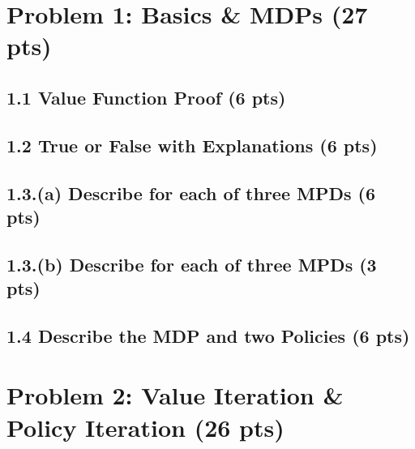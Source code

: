 \documentclass[12pt]{article}
\begin{document}
\newpage
\section*{Problem 1: Basics \& MDPs (27 pts)} 

\subsection*{1.1 Value Function Proof (6 pts)}
\begin{solution}[height=20cm]
\end{solution}

\subsection*{1.2 True or False with Explanations (6 pts)}
\begin{solution}[height=10cm]
\end{solution}

\subsection*{1.3.(a) Describe for each of three MPDs (6 pts)}
\begin{solution}[height=8cm]
\end{solution}

\subsection*{1.3.(b) Describe for each of three MPDs (3 pts)}
\begin{solution}[height=8cm]
\end{solution}

\subsection*{1.4 Describe the MDP and two Policies (6 pts)}
\begin{solution}[height=10cm]
\end{solution}

\section*{Problem 2: Value Iteration \& Policy Iteration (26 pts)}
\end{document}
